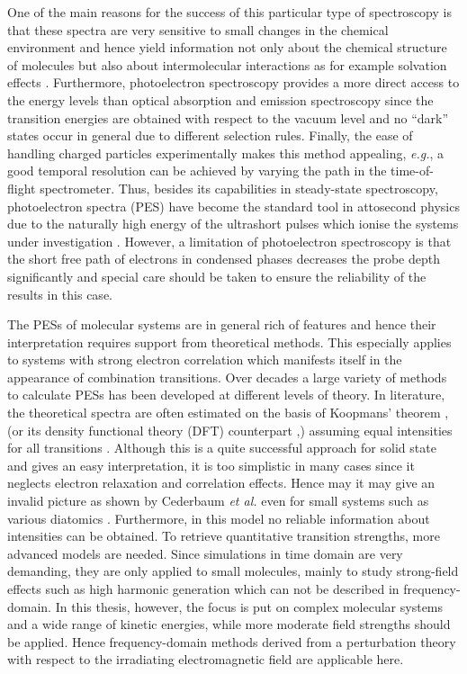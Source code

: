 One of the main reasons for the success of this particular type of spectroscopy is that these spectra are very sensitive to small changes in the chemical environment and hence yield information not only about the chemical structure of molecules but also about intermolecular interactions as for example solvation effects \cite{winterWater, solution1,solution2, solution3, solution4}.
Furthermore, photoelectron spectroscopy provides a more direct access to the energy levels than optical absorption and emission spectroscopy since the transition energies are obtained with respect to the vacuum level and no ``dark'' states occur in general due to different selection rules.
Finally, the ease of handling charged particles experimentally makes this method appealing, \textit{e.g.}, a good temporal resolution can be achieved by varying the path in the time-of-flight spectrometer.
Thus, besides its capabilities in steady-state spectroscopy, photoelectron spectra (PES) have become the standard tool in attosecond physics due to the naturally high energy of the ultrashort pulses which ionise the systems under investigation \cite{as1, as2, as3, as4, as5, as6}.
However, a limitation of photoelectron spectroscopy is that the short free path of electrons in condensed phases decreases the probe depth significantly and special care should be taken to ensure the reliability of the results in this case.

The PESs of molecular systems are in general rich of features and hence their interpretation requires support from theoretical methods.
This especially applies to systems with strong electron correlation which manifests itself in the appearance of combination transitions.
Over decades a large variety of methods to calculate PESs has been developed at different levels of theory.
In literature, the theoretical spectra are often estimated on the basis of Koopmans' theorem \cite{koopmans}, (or its density functional theory (DFT) counterpart \cite{koopmansDFT},) assuming equal intensities for all transitions \cite{OT-RSH,Koerzd1,Koerzd2,Gao_wopperer}.
Although this is a quite successful approach for solid state \cite{Solid2,Leckey1992} and gives an easy interpretation, it is too simplistic in many cases since it neglects electron relaxation and correlation effects. 
Hence may it may give an invalid picture as shown by Cederbaum \textit{et al.} even for small systems such as various diatomics \cite{2phcederbaum2, cederbaumN2}.
Furthermore, in this model no reliable information about intensities can be obtained.
To retrieve quantitative  transition strengths, more advanced models are needed.
Since simulations in time domain are very demanding, they are only applied to small molecules, mainly to study strong-field effects such as high harmonic generation \cite{H2pDeCleva,as2,hhg, zhangHHG,dromey_HHG} which can not be described in frequency-domain.
In this thesis, however, the focus is put on complex molecular systems and a wide range of kinetic energies, while more moderate field strengths should be applied.
Hence frequency-domain methods derived from a perturbation theory with respect to the irradiating electromagnetic field are applicable here.

